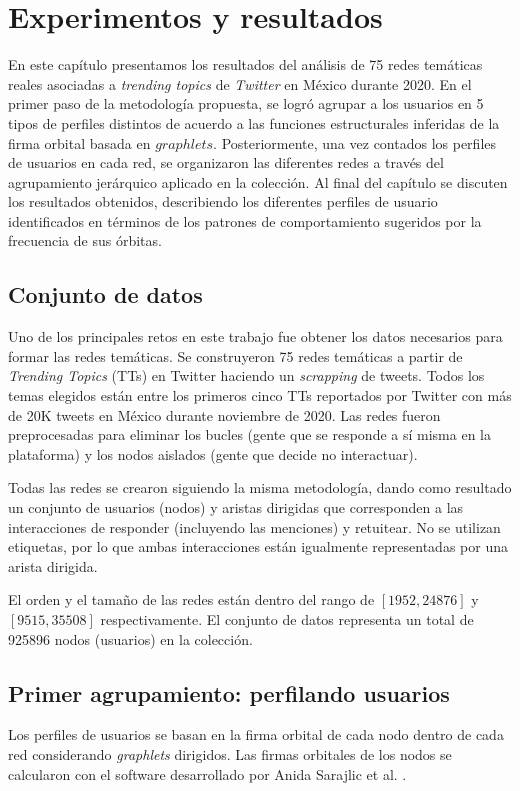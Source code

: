 \chapter{Experimentos y resultados}
\label{chapter:5}

En este capítulo presentamos los resultados del análisis de 75 redes temáticas reales asociadas a \textit{trending topics} de \textit{Twitter} en México durante 2020. En el primer paso de la metodología propuesta, se logró agrupar a los usuarios en 5 tipos de perfiles distintos de acuerdo a las funciones estructurales inferidas de la firma orbital basada en $graphlets$. Posteriormente, una vez contados los perfiles de usuarios en cada red, se organizaron las diferentes redes a través del agrupamiento jerárquico aplicado en la colección. Al final del capítulo se discuten los resultados obtenidos, describiendo los diferentes perfiles de usuario identificados en términos de los patrones de comportamiento sugeridos por la frecuencia de sus órbitas. 

\section{Conjunto de datos}
Uno de los principales retos en este trabajo fue obtener los datos necesarios para formar las redes temáticas. Se construyeron 75 redes temáticas a partir de \textit{Trending Topics} (TTs) en Twitter haciendo un \textit{scrapping} de tweets. Todos los temas elegidos están entre los primeros cinco TTs reportados por Twitter con más de 20K tweets en México durante noviembre de 2020. Las redes fueron preprocesadas para eliminar los bucles (gente que se responde a sí misma en la plataforma) y los nodos aislados (gente que decide no interactuar).

Todas las redes se crearon siguiendo la misma metodología, dando como resultado un conjunto de usuarios (nodos) y aristas dirigidas que corresponden a las interacciones de responder (incluyendo las menciones) y retuitear. No se utilizan etiquetas, por lo que ambas interacciones están igualmente representadas por una arista dirigida. 

El orden y el tamaño de las redes están dentro del rango de $[1952,24876]$ y $[9515,35508]$ respectivamente. El conjunto de datos representa un total de 925896 nodos (usuarios) en la colección.

\section{Primer agrupamiento: perfilando usuarios}
Los perfiles de usuarios se basan en la firma orbital de cada nodo dentro de cada red considerando \textit{graphlets} dirigidos. Las firmas orbitales de los nodos se calcularon con el software desarrollado por Anida Sarajlic et al. \cite{sarajlic_graphlet-based_2016}. 

